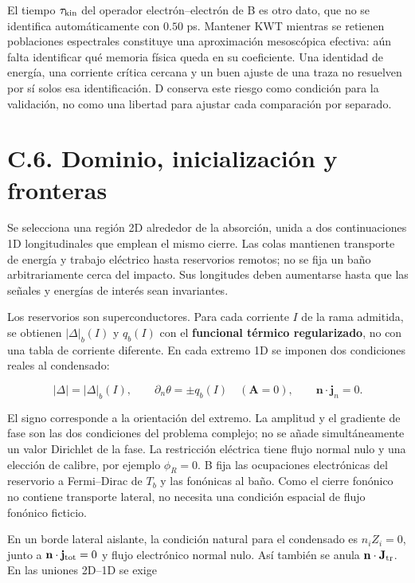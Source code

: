 \documentclass[
  spanish,
  10pt,
  a4paper,
]{article}
\begin{document}
El tiempo \(\tau_{\rm kin}\) del operador electrón--electrón de B es
otro dato, que no se identifica automáticamente con \(0.50\) ps.
Mantener KWT mientras se retienen poblaciones espectrales constituye una
aproximación mesoscópica efectiva: aún falta identificar qué memoria
física queda en su coeficiente. Una identidad de energía, una corriente
crítica cercana y un buen ajuste de una traza no resuelven por sí solos
esa identificación. D conserva este riesgo como condición para la
validación, no como una libertad para ajustar cada comparación por
separado.

\section{C.6. Dominio, inicialización y
fronteras}\label{c.6.-dominio-inicializaciuxf3n-y-fronteras}

Se selecciona una región 2D alrededor de la absorción, unida a dos
continuaciones 1D longitudinales que emplean el mismo cierre. Las colas
mantienen transporte de energía y trabajo eléctrico hasta reservorios
remotos; no se fija un baño arbitrariamente cerca del impacto. Sus
longitudes deben aumentarse hasta que las señales y energías de interés
sean invariantes.

Los reservorios son superconductores. Para cada corriente \(I\) de la
rama admitida, se obtienen \(|\Delta|_b(I)\) y \(q_b(I)\) con el
\textbf{funcional térmico regularizado}, no con una tabla de corriente
diferente. En cada extremo 1D se imponen dos condiciones reales al
condensado:

\[
|\Delta|=|\Delta|_b(I),\qquad
\partial_n\theta=\pm q_b(I)\quad(\mathbf A=0),\qquad
\mathbf n\cdot\mathbf j_n=0.
\tag{C.25}
\]

El signo corresponde a la orientación del extremo. La amplitud y el
gradiente de fase son las dos condiciones del problema complejo; no se
añade simultáneamente un valor Dirichlet de la fase. La restricción
eléctrica tiene flujo normal nulo y una elección de calibre, por ejemplo
\(\phi_R=0\). B fija las ocupaciones electrónicas del reservorio a
Fermi--Dirac de \(T_b\) y las fonónicas al baño. Como el cierre fonónico
no contiene transporte lateral, no necesita una condición espacial de
flujo fonónico ficticio.

En un borde lateral aislante, la condición natural para el condensado es
\(n_iZ_i=0\), junto a \(\mathbf n\cdot\mathbf j_{\rm tot}=0\) y flujo
electrónico normal nulo. Así también se anula
\(\mathbf n\cdot\mathbf J_{\rm tr}\). En las uniones 2D--1D se exige
\end{document}
